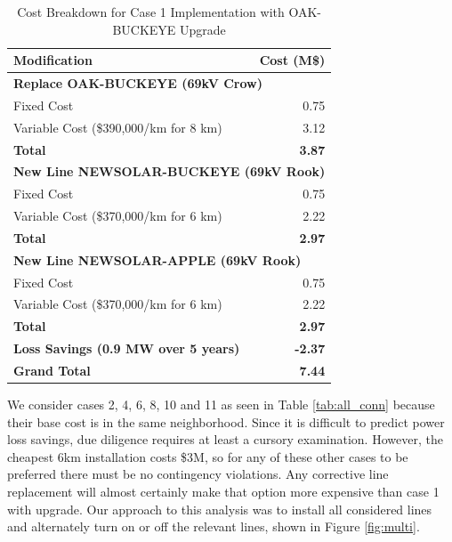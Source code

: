 \documentclass[conference]{IEEEtran}
\begin{document}
\begin{table}[h!]
	\centering
	\begin{tabular}{|l|r|}
		\hline
		\textbf{Modification} & \textbf{Cost (M\$)} \\ \hline
		\multicolumn{2}{|l|}{\textbf{Replace OAK-BUCKEYE (69kV Crow)}} \\ 
		\hspace{1em} Fixed Cost & 0.75 \\ 
		\hspace{1em} Variable Cost (\$390,000/km for 8 km) & 3.12 \\ 
		\hspace{1em} \textbf{Total} & \textbf{3.87} \\ \hline
		\multicolumn{2}{|l|}{\textbf{New Line NEWSOLAR-BUCKEYE (69kV Rook)}} \\ 
		\hspace{1em} Fixed Cost & 0.75 \\ 
		\hspace{1em} Variable Cost (\$370,000/km for 6 km) & 2.22 \\ 
		\hspace{1em} \textbf{Total} & \textbf{2.97} \\ \hline
		\multicolumn{2}{|l|}{\textbf{New Line NEWSOLAR-APPLE (69kV Rook)}} \\ 
		\hspace{1em} Fixed Cost & 0.75 \\ 
		\hspace{1em} Variable Cost (\$370,000/km for 6 km) & 2.22 \\ 
		\hspace{1em} \textbf{Total} & \textbf{2.97} \\ \hline
		\textbf{Loss Savings (0.9 MW over 5 years)} & \textbf{-2.37} \\ \hline
		\textbf{Grand Total} & \textbf{7.44} \\ \hline
	\end{tabular}
	\vspace{0.5em}
	\caption{Cost Breakdown for Case 1 Implementation with OAK-BUCKEYE Upgrade}
	\label{tab:cost_breakdown_case1}
\end{table}
We consider cases 2, 4, 6, 8, 10 and 11 as seen in Table \ref{tab:all_conn} because their base cost is in the same neighborhood. Since it is difficult to predict power loss savings, due diligence requires at least a cursory examination. However, the cheapest 6km installation costs \$3M, so for any of these other cases to be preferred there must be no contingency violations. Any corrective line replacement will almost certainly make that option more expensive than case 1 with upgrade. Our approach to this analysis was to install all considered lines and alternately turn on or off the relevant lines, shown in Figure \ref{fig:multi}.
\end{document}

